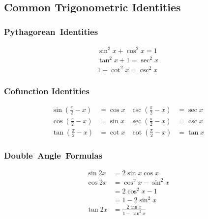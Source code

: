 \subsection*{Common Trigonometric Identities}

\noindent%
\begin{minipage}[t]{.25\linewidth}
	\subsubsection*{Pythagorean~Identities}
	\begin{align*}
		\sin ^2x+\cos ^2x= 1 \\
		\tan^2x+ 1 = \sec^2 x \\
		1 + \cot^2x=\csc^2 x
	\end{align*}
\end{minipage}%
\begin{minipage}[t]{.45\linewidth}
	\subsubsection*{Cofunction Identities}
	\begin{align*}
		\sin\left(\frac{\pi}{2}-x\right) &= \cos x &
		\csc\left(\frac{\pi}{2}-x\right) &= \sec x \\
		\cos\left(\frac{\pi}{2}-x\right) &= \sin x &
		\sec\left(\frac{\pi}{2}-x\right) &= \csc x \\
		\tan\left(\frac{\pi}{2}-x\right) &= \cot x &
		\cot\left(\frac{\pi}{2}-x\right) &= \tan x
	\end{align*}
\end{minipage}%
\begin{minipage}[t]{.25\linewidth}
	\subsubsection*{Double~Angle~Formulas}
	\begin{align*}
		\sin 2x &= 2\sin x\cos x \\
		\cos 2x &= \cos^2x - \sin^2 x \\
		&= 2\cos^2x-1 \\
		&= 1-2\sin^2x \\
		\tan 2x &= \frac{2\tan x}{1-\tan^2 x}
	\end{align*}
\end{minipage}

\bigskip

